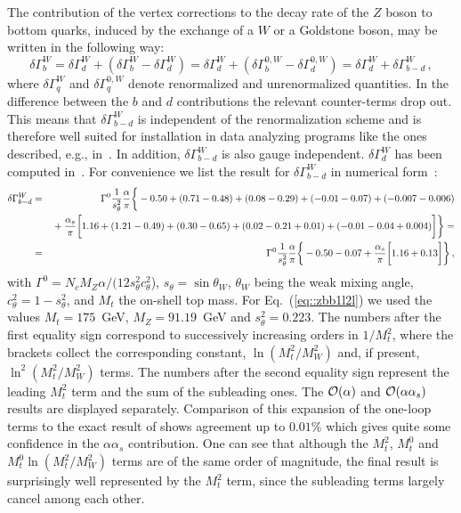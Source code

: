 The contribution of the vertex corrections to the decay rate of the $Z$
boson to bottom quarks, induced by the exchange of a $W$ or a Goldstone
boson, may be written in the following way:
\begin{equation}
\delta\Gamma_b^W = 
\delta\Gamma_d^W + (\delta\Gamma_b^W - \delta\Gamma_d^W) = 
\delta\Gamma_d^W + (\delta\Gamma_b^{0,W} - \delta\Gamma_d^{0,W}) = 
\delta\Gamma_d^W + \delta\Gamma^W_{b-d}\,,
\label{eq::delgamb}
\end{equation}
where $\delta\Gamma_q^{W}$ and $\delta\Gamma_q^{0,W}$ denote
renormalized and unrenormalized quantities. In the difference between
the $b$ and $d$ contributions the relevant counter-terms drop out.  This
means that $\delta\Gamma^W_{b-d}$ is independent of the renormalization
scheme and is therefore well suited for installation in data analyzing
programs like the ones described, e.g., in~\cite{YelRep95}. In addition,
$\delta\Gamma^W_{b-d}$ is also gauge independent. $\delta\Gamma_d^W$ has
been computed in~\cite{CzaKue96}.  
For convenience we list the result for $\delta\Gamma^W_{b-d}$ in
numerical form~\cite{HarSeiSte97}:
\begin{eqnarray}
\delta\Gamma^W_{b-d} &=&
    \Gamma^0 {1\over s^2_\theta}
    {\alpha\over \pi}
%
%
  \bigg\{ - 0.50
  + (0.71 -0.48)+ (0.08 - 0.29) + (-0.01 - 0.07) + (-0.007 - 0.006)
%
  \nonumber\\[0em]&&\mbox{}
%
  + {\alpha_s\over \pi} \bigg[ 1.16 + (1.21 - 0.49) + (0.30 - 0.65) +
  (0.02 - 0.21 + 0.01)
%
%
+ (-0.01 - 0.04
  + 0.004) \bigg] \bigg\} =
%
\nonumber\\
%
&=&\Gamma^0 {1\over s^2_\theta} {\alpha\over \pi} \bigg\{- 0.50 - 0.07 +
{\alpha_s\over \pi} \bigg[ 1.16 + 0.13 \bigg]\bigg\}\,,
\label{eq::zbb1l2l}
\end{eqnarray}
with $\Gamma^0 = N_cM_Z\alpha/(12s_\theta^2c_\theta^2$), $s_\theta =
\sin\theta_W$, $\theta_W$ being the weak mixing angle, $c_\theta^2 =
1-s_\theta^2$, and $M_t$ the on-shell top mass.  For
Eq.~(\ref{eq::zbb1l2l}) we used the values $M_t = 175$~GeV,
$M_Z=91.19$~GeV and $s_\theta^2 = 0.223$.  The numbers after the first
equality sign correspond to successively increasing orders in $1/M_t^2$,
where the brackets collect the corresponding constant, $\ln
(M_t^2/M_W^2)$ and, if present, $\ln^2(M_t^2/M_W^2)$ terms. The numbers
after the second equality sign represent the leading $M_t^2$ term and
the sum of the subleading ones.  The ${\cal O}(\alpha)$ and ${\cal
  O}(\alpha\alpha_s)$ results are displayed separately. Comparison of
this expansion of the one-loop terms to the exact result of
\cite{BeeHol88} shows agreement up to $0.01\%$ which gives quite some
confidence in the $\alpha\alpha_s$ contribution.  One can see that
although the $M_t^2$, $M_t^0$ and $M_t^0\ln(M_t^2/M_W^2)$ terms are of the same
order of magnitude, the final result is surprisingly well represented by
the $M_t^2$ term, since the subleading terms largely cancel among each
other.

